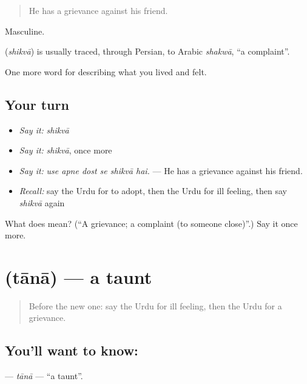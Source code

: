 \begin{quote}
He has a grievance against his friend.
\end{quote}

Masculine.

\begin{cousinweb}
\textbf{} (\emph{shikvā}) is usually traced, through Persian, to Arabic \emph{shakwā}, \textquotedblleft{}a complaint\textquotedblright{}.
\end{cousinweb}

\begin{grammarlens}[title={What you've built}]
One more word for describing what you lived and felt.
\end{grammarlens}

\subsection*{Your turn}
\begin{itemize}
\raggedright
  \item \emph{Say it:} \emph{shikvā}
  \item \emph{Say it:} \emph{shikvā}, once more
  \item \emph{Say it:} \emph{use apne dost se shikvā hai.} — He has a grievance against his friend.
  \item \emph{Recall:} say the Urdu for to adopt, then the Urdu for ill feeling, then say \emph{shikvā} again
\end{itemize}

\begin{tcolorbox}[breakable,colback=teal!4,colframe=teal!35!black,title={Before you move on}]
What does  mean? (\textquotedblleft{}A grievance; a complaint (to someone close)\textquotedblright{}.) Say it once more.
\end{tcolorbox}
\section[\texorpdfstring{\ur{طعنہ} (tānā)}{طعنہ (tānā)}]{ (tānā) — a taunt}

\label{lesson:UR-C491-tana}



\begin{quote}
Before the new one: say the Urdu for ill feeling, then the Urdu for a grievance.
\end{quote}

\subsection*{You'll want to know: }
\textbf{} — \emph{tānā} — \textquotedblleft{}a taunt\textquotedblright{}.

